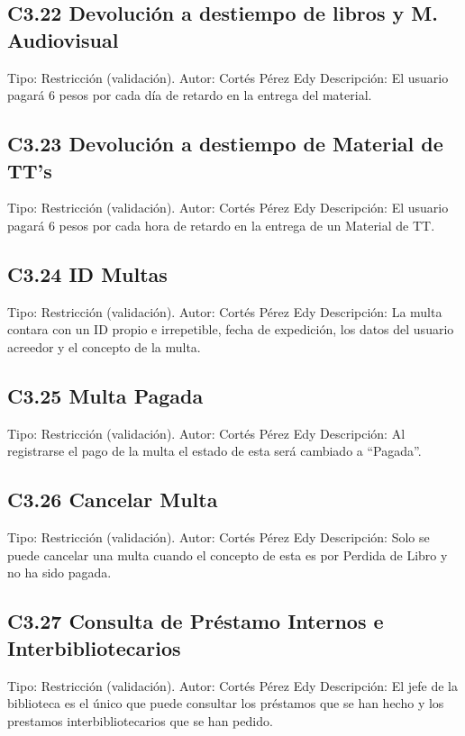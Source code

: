 \subsection{C3.22 Devolución a destiempo de libros y M. Audiovisual}
	\UCli Tipo: Restricción (validación).
	\UCli Autor: Cortés Pérez Edy
	\UCli Descripción: El usuario pagará 6 pesos por cada día de retardo en la entrega del material.
	
\subsection{C3.23 Devolución a destiempo de Material de TT's}
	\UCli Tipo: Restricción (validación).
	\UCli Autor: Cortés Pérez Edy
	\UCli Descripción: El usuario pagará 6 pesos por cada hora de retardo en la entrega de un Material de TT.
	
\subsection{C3.24 ID Multas}
	\UCli Tipo: Restricción (validación).
	\UCli Autor: Cortés Pérez Edy
	\UCli Descripción: La multa contara con un ID propio e irrepetible, fecha de expedición, los datos del usuario acreedor y el concepto de la multa.
	
\subsection{C3.25 Multa Pagada}
	\UCli Tipo: Restricción (validación).
	\UCli Autor: Cortés Pérez Edy
	\UCli Descripción: Al registrarse el pago de la multa el estado de esta será cambiado a “Pagada”.
	
\subsection{C3.26 Cancelar Multa}
	\UCli Tipo: Restricción (validación).
	\UCli Autor: Cortés Pérez Edy
	\UCli Descripción: Solo se puede cancelar una multa cuando el concepto de esta es por Perdida de Libro y no ha sido pagada.
	
\subsection{C3.27 Consulta de Préstamo Internos e Interbibliotecarios}
	\UCli Tipo: Restricción (validación).
	\UCli Autor: Cortés Pérez Edy
	\UCli Descripción: El jefe de la biblioteca es el único que puede consultar los préstamos que se han hecho y los prestamos interbibliotecarios que se han pedido.
	
